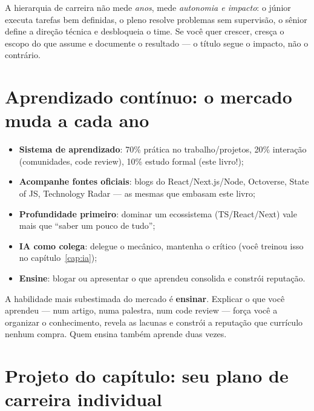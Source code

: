 \begin{caixaconceito}
A hierarquia de carreira não mede \emph{anos}, mede \emph{autonomia e
impacto}: o júnior executa tarefas bem definidas, o pleno resolve problemas
sem supervisão, o sênior define a direção técnica e desbloqueia o time. Se
você quer crescer, cresça o escopo do que assume e documente o resultado —
o título segue o impacto, não o contrário.
\end{caixaconceito}

\section{Aprendizado contínuo: o mercado muda a cada ano}

\begin{itemize}[leftmargin=*, itemsep=0.4em]
  \item \textbf{Sistema de aprendizado}: 70\% prática no trabalho/projetos, 20\% interação (comunidades, code review), 10\% estudo formal (este livro!);
  \item \textbf{Acompanhe fontes oficiais}: blogs do React/Next.js/Node, Octoverse, State of JS, Technology Radar — as mesmas que embasam este livro;
  \item \textbf{Profundidade primeiro}: dominar um ecossistema (TS/React/Next) vale mais que ``saber um pouco de tudo'';
  \item \textbf{IA como colega}: delegue o mecânico, mantenha o crítico (você treinou isso no capítulo~\ref{cap:ia});
  \item \textbf{Ensine}: blogar ou apresentar o que aprendeu consolida e constrói reputação.
\end{itemize}

\begin{caixadica}
A habilidade mais subestimada do mercado é \textbf{ensinar}. Explicar o que
você aprendeu — num artigo, numa palestra, num code review — força você a
organizar o conhecimento, revela as lacunas e constrói a reputação que
currículo nenhum compra. Quem ensina também aprende duas vezes.
\end{caixadica}

\section{Projeto do capítulo: seu plano de carreira individual}
\label{sec:projeto25}

